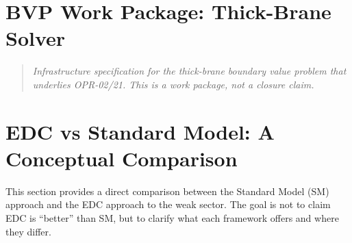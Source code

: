 \documentclass[11pt,a4paper]{book}
\theoremstyle{definition}
\theoremstyle{remark}
\begin{document}
\chapter{BVP Work Package: Thick-Brane Solver}
\label{ch:bvp_workpackage}

\begin{quote}
\textit{Infrastructure specification for the thick-brane boundary value problem
that underlies OPR-02/21. This is a work package, not a closure claim.}
\end{quote}



\chapter*{EDC vs Standard Model: A Conceptual Comparison}

This section provides a direct comparison between the Standard Model (SM) approach
and the EDC approach to the weak sector. The goal is not to claim EDC is ``better''
than SM, but to clarify what each framework offers and where they differ.
\end{document}
